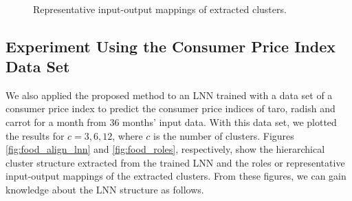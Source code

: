 \documentclass{article}
\begin{document}
\begin{figure}[t]
\\ \vspace{-0.01\hsize}

\caption{Representative input-output mappings of extracted clusters. }
\label{fig:mnist_roles}
\end{figure}

\subsection{Experiment Using the Consumer Price Index Data Set}
\label{sec:food}

We also applied the proposed method to an LNN trained with a data set of a consumer price index\cite{estat} to predict the consumer price indices of taro, radish and carrot for a month from $36$ months' input data. 
With this data set, we plotted the results for $c=3,6,12$, where $c$ is the number of clusters. 
Figures \ref{fig:food_align_lnn} and \ref{fig:food_roles}, respectively, show the hierarchical cluster structure extracted from the trained LNN and the roles or representative input-output mappings of the extracted clusters. 
From these figures, we can gain knowledge about the LNN structure as follows. 
\end{document}
